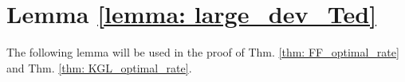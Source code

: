 \documentclass[journal,11pt,draftcls,onecolumn]{IEEEtran}
\newtheorem{corollary}{Corollary}
\begin{document}
%
%
%



%

%


\section{Lemma \ref{lemma: large_dev_Ted}}
The following lemma will be used in the proof of Thm. \ref{thm: FF_optimal_rate} and Thm. \ref{thm: KGL_optimal_rate}.

\end{document}
